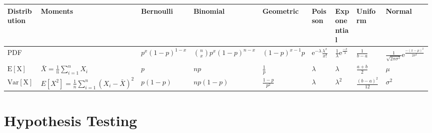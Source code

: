 \documentclass[8pt]{extarticle}
\begin{document}
\begin{center}
    \begin{tabular}{ | l || l || l | l | l | l || l | l | l | }
    \hline
    Distribution & Moments & Bernoulli & Binomial & Geometric & Poisson & Exponential & Uniform & Normal \\ \hline

    PDF &
        & $p^x(1-p)^{1-x}$
        & $\binom{n}{x}p^x(1-p)^{n-x}$
        & $(1-p)^{x-1}p$
        & $\mathrm{e}^{-\lambda}\frac{\lambda^x}{x!}$
        & $\frac{1}{\lambda}\mathrm{e}^{\frac{-x}{\lambda}}$
        & $\frac{1}{b-a}$
        & $\frac{1}{\sqrt{2\pi\sigma^2}}\mathrm{e}^{\frac{-(x-\mu)^2}{2\sigma^2}}$ \\ \hline

    $\mathrm{E[X]}$ & $\bar{X} = \frac{1}{n}\displaystyle\sum_{i=1}^{n} X_i$
                    & $p$
                    & $np$
                    & $\frac{1}{p}$
                    & $\lambda$
                    & $\lambda$
                    & $\frac{a+b}{2}$
                    & $\mu$ \\ \hline

    $\mathrm{Var[X]}$ & $E[X^2] = \frac{1}{n}\displaystyle\sum_{i=1}^{n} (X_i - \bar{X})^2$
                      & $p(1-p)$
                      & $np(1-p)$
                      & $\frac{1-p}{p^2}$
                      & $\lambda$
                      & $\lambda^2$
                      & $\frac{(b-a)^2}{12}$
                      & $\sigma^2$ \\ \hline
    \end{tabular}
\end{center}


\section{Hypothesis Testing}
\end{document}
